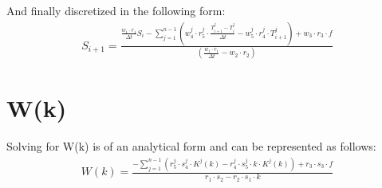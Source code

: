 \documentclass{article}
\def\ds{\displaystyle}
\begin{document}
And finally discretized in the following form:
\begin{align}
S_{i+1} =  \frac{\frac{w_1 \cdot r_1}{\Delta t}S_i - \ds\sum_{j=1}^{n-1} \left( w_4^j \cdot r_5^j \cdot \frac{T^j_{i+1} - T^j_i}{\Delta t} - w_5^j \cdot r_4^j \cdot T^j_{i+1} \right) + w_3 \cdot r_3 \cdot f}{\left( \frac{w_1 \cdot r_1}{\Delta t} - w_2 \cdot r_2 \right)}
\end{align}

\section*{W(k)}
Solving for W(k) is of an analytical form and can be represented as follows:  
\begin{align}
W(k) = \frac{ -\ds\sum_{j=1}^{n-1} \left( r_5^j \cdot s_4^j \cdot K^j(k) - r_4^j \cdot s_5^j \cdot k \cdot K^j(k) \right) + r_3 \cdot s_3 \cdot f }{r_1 \cdot s_2 - r_2 \cdot s_1 \cdot k}
\end{align}

\newpage
\end{document}
